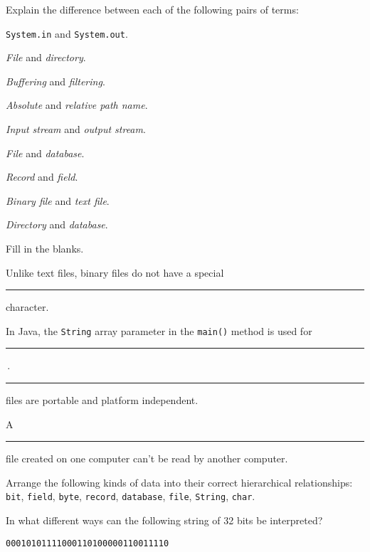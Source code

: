 \begin{EXRtwo}

\item  Explain the difference between each of the following pairs of terms:

\begin{EXRtwoLL}
\begin{multicols}{2}
\item  {\tt System.in} and {\tt System.out}.
\item  {\it File} and {\it directory}.
\item  {\it Buffering} and {\it filtering}.
\item  {\it Absolute} and {\it relative path name}.
\item  {\it Input stream} and {\it output stream}.
\item  {\it File} and {\it database}.
\item  {\it Record} and {\it field}.
\item  {\it Binary file} and {\it text file}.
\item  {\it Directory} and {\it database}.
\end{multicols}
\end{EXRtwoLL}

\item  Fill in the blanks.
\begin{EXRtwoLL}\baselineskip=15pt
\item  Unlike text files, binary files do not have a
special \rule{60pt}{0.5pt} character.
\item  In Java, the {\tt String} array parameter in the
{\tt main()} method is used for \rule{60pt}{0.5pt}\,.
\item  \rule{60pt}{0.5pt} files are portable and platform
independent.
\item  A  \rule{70pt}{0.5pt}  file  created on one
computer can't be read by another \mbox{computer.}
\end{EXRtwoLL}\baselineskip=11pt

\item  Arrange the following kinds of data into their
correct hierarchical relationships: {\tt bit},
{\tt field}, {\tt byte}, {\tt record}, {\tt database},
{\tt file}, {\tt String}, {\tt char}.

\item  In what different ways can the following string
of 32 bits be interpreted?
\begin{jjjlisting}
\begin{lstlisting}
00010101111000110100000110011110
\end{lstlisting}
\end{jjjlisting}


\end{EXRtwo}
